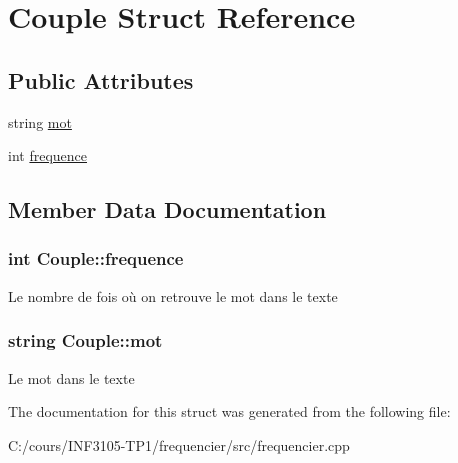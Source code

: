 \hypertarget{struct_couple}{}\section{Couple Struct Reference}
\label{struct_couple}
\subsection*{Public Attributes}
\begin{DoxyCompactItemize}
\item 
string \hyperlink{struct_couple_a96d6885f158ca7cb74ab30035e13a79e}{mot}
\item 
int \hyperlink{struct_couple_a230f654557fdbdba4d0ba15ecde6ba41}{frequence}
\end{DoxyCompactItemize}


\subsection{Member Data Documentation}
\hypertarget{struct_couple_a230f654557fdbdba4d0ba15ecde6ba41}{}
\subsubsection[{frequence}]{\setlength{\rightskip}{0pt plus 5cm}int Couple\+::frequence}\label{struct_couple_a230f654557fdbdba4d0ba15ecde6ba41}
Le nombre de fois où on retrouve le mot dans le texte \hypertarget{struct_couple_a96d6885f158ca7cb74ab30035e13a79e}{}
\subsubsection[{mot}]{\setlength{\rightskip}{0pt plus 5cm}string Couple\+::mot}\label{struct_couple_a96d6885f158ca7cb74ab30035e13a79e}
Le mot dans le texte 

The documentation for this struct was generated from the following file\+:\begin{DoxyCompactItemize}
\item 
C\+:/cours/\+I\+N\+F3105-\/\+T\+P1/frequencier/src/frequencier.\+cpp\end{DoxyCompactItemize}
